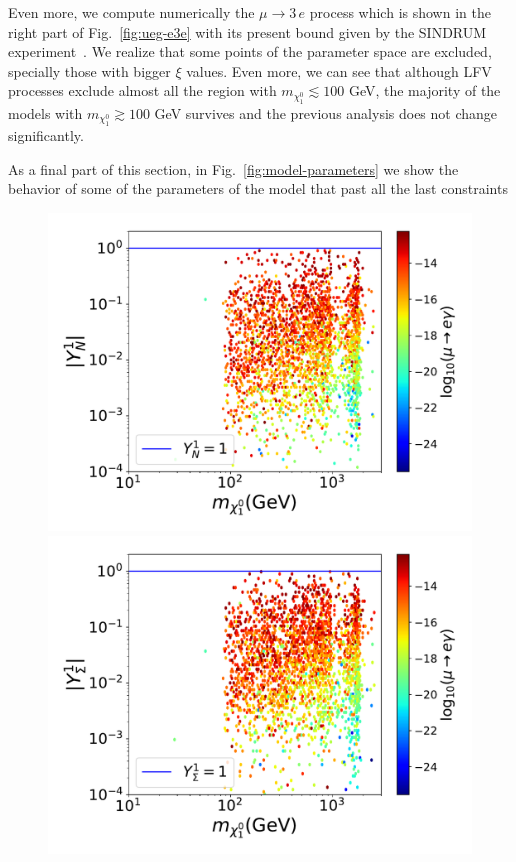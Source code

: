 \documentclass[12pt,letterpaper]{article}
\begin{document}
Even more, we compute numerically the $\mu\rightarrow 3\,e$ process which is shown in the right part of Fig.~\ref{fig:ueg-e3e} with its present bound given by the SINDRUM experiment~\cite{Bertl:1985mw}.
We realize that some points of the parameter space are excluded, specially those with bigger $\xi$ values. Even more, we can see that although LFV processes exclude almost all the region with $m_{\chi^0_1}\lesssim 100$ GeV, the majority of the models with $m_{\chi^0_1} \gtrsim 100$ GeV survives and the previous analysis does not change significantly. 

As a final part of this section, in Fig.~\ref{fig:model-parameters} we show the behavior of some of the parameters of the model that past all the last constraints
%
\begin{figure}
\begin{center}
\includegraphics[scale=0.4]{YN1}
\includegraphics[scale=0.4]{YTF1}

\end{center}
\end{figure}
\end{document}
